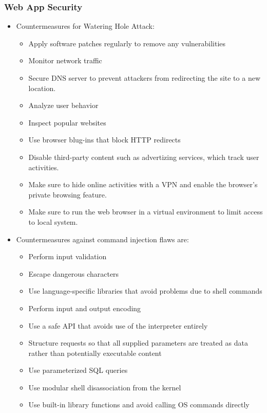 \subsubsection{Web App Security}
\begin{itemize}
    \item Countermeasures for Watering Hole Attack:
    \begin{itemize}
        \item Apply software patches regularly to remove any vulnerabilities
        \item Monitor network traffic
        \item Secure DNS server to prevent attackers from redirecting the site to a new location.
        \item Analyze user behavior
        \item Inspect popular websites
        \item Use browser blug-ins that block HTTP redirects
        \item Disable third-party content such as advertizing services, which track user activities.
        \item Make sure to hide online activities with a VPN and enable the browser's private browsing feature.
        \item Make sure to run the web browser in a virtual environment to limit access to local system.
    \end{itemize}
    \item Countermeasures against command injection flaws are:
    \begin{itemize}
        \item Perform input validation
        \item Escape dangerous characters
        \item Use language-specific libraries that avoid problems due to shell commands
        \item Perform input and output encoding
        \item Use a safe API that avoids use of the interpreter entirely
        \item Structure requests so that all supplied parameters are treated as data rather than potentially executable content
        \item Use parameterized SQL queries
        \item Use modular shell disassociation from the kernel
        \item Use built-in library functions and avoid calling OS commands directly

\end{itemize}
\end{itemize}
